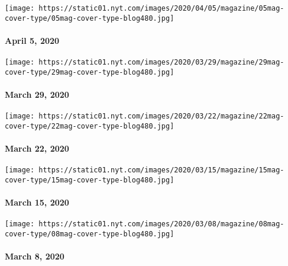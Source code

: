 \href{https://www.nytimes.com/issue/magazine/2020/04/03/the-4520-issue}{}

\texttt{[image: https://static01.nyt.com/images/2020/04/05/magazine/05mag-cover-type/05mag-cover-type-blog480.jpg]}

\hypertarget{april-5-2020}{%
\paragraph{April 5, 2020}\label{april-5-2020}}

\href{https://www.nytimes.com/issue/magazine/2020/03/27/the-32920-issue}{}

\texttt{[image: https://static01.nyt.com/images/2020/03/29/magazine/29mag-cover-type/29mag-cover-type-blog480.jpg]}

\hypertarget{march-29-2020}{%
\paragraph{March 29, 2020}\label{march-29-2020}}

\href{https://www.nytimes.com/issue/magazine/2020/03/19/the-32220-issue}{}

\texttt{[image: https://static01.nyt.com/images/2020/03/22/magazine/22mag-cover-type/22mag-cover-type-blog480.jpg]}

\hypertarget{march-22-2020}{%
\paragraph{March 22, 2020}\label{march-22-2020}}

\href{https://www.nytimes.com/interactive/2020/03/11/magazine/best-songs.html\#cover}{}

\texttt{[image: https://static01.nyt.com/images/2020/03/15/magazine/15mag-cover-type/15mag-cover-type-blog480.jpg]}

\hypertarget{march-15-2020}{%
\paragraph{March 15, 2020}\label{march-15-2020}}

\href{https://www.nytimes.com/issue/magazine/2020/03/05/the-3820-issue}{}

\texttt{[image: https://static01.nyt.com/images/2020/03/08/magazine/08mag-cover-type/08mag-cover-type-blog480.jpg]}

\hypertarget{march-8-2020}{%
\paragraph{March 8, 2020}\label{march-8-2020}}

